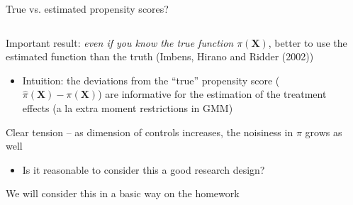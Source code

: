 \documentclass[notes,11pt, aspectratio=169]{beamer}
\newenvironment{wideitemize}{\itemize\addtolength{\itemsep}{10pt}}{\enditemize}
\begin{document}
\begin{frame}{True vs. estimated propensity scores?}
\begin{columns}[T] %
\begin{column}{.9\textwidth}
  \begin{wideitemize}
  \item Important result: \emph{even if you know the true function
      $\pi(\mathbf{X})$}, better to use the estimated function than
    the truth (Imbens, Hirano and Ridder (2002))
    \begin{itemize}
    \item Intuition: the deviations from the ``true'' propensity score
      ($\hat{\pi}(\mathbf{X}) - \pi(\mathbf{X})$) are informative for
      the estimation of the treatment effects (a la extra moment
      restrictions in GMM)
    \end{itemize}
  \item Clear tension -- as dimension of controls increases, the noisiness in $\pi$ grows as well
    \begin{itemize}
    \item Is it reasonable to consider this a good research design?
    \end{itemize}
    \item We will consider this in a basic way on the homework
    \end{wideitemize}
\end{column}%
\hfill%
\begin{column}{.4\textwidth}

\end{column}%
\end{columns}
\end{frame}
\end{document}
